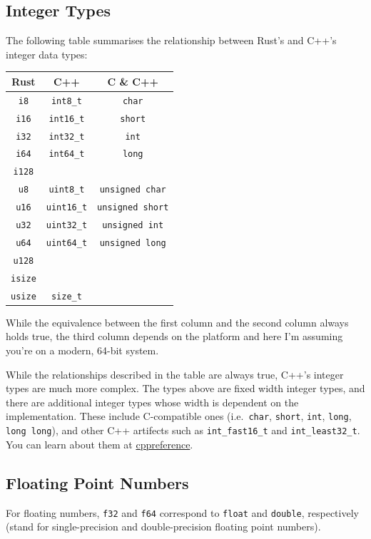 \documentclass[
]{book}
\begin{document}
\hypertarget{integer-types}{%
\subsection{Integer Types}\label{integer-types}}

The following table summarises the relationship between Rust's and C++'s integer data types:

\begin{longtable}[]{@{}ccc@{}}
\toprule
Rust & C++ & C \& C++\tabularnewline
\midrule
\endhead
\texttt{i8} & \texttt{int8\_t} & \texttt{char}\tabularnewline
\texttt{i16} & \texttt{int16\_t} & \texttt{short}\tabularnewline
\texttt{i32} & \texttt{int32\_t} & \texttt{int}\tabularnewline
\texttt{i64} & \texttt{int64\_t} & \texttt{long}\tabularnewline
\texttt{i128} & &\tabularnewline
\texttt{u8} & \texttt{uint8\_t} & \texttt{unsigned\ char}\tabularnewline
\texttt{u16} & \texttt{uint16\_t} & \texttt{unsigned\ short}\tabularnewline
\texttt{u32} & \texttt{uint32\_t} & \texttt{unsigned\ int}\tabularnewline
\texttt{u64} & \texttt{uint64\_t} & \texttt{unsigned\ long}\tabularnewline
\texttt{u128} & &\tabularnewline
\texttt{isize} & &\tabularnewline
\texttt{usize} & \texttt{size\_t} &\tabularnewline
\bottomrule
\end{longtable}

While the equivalence between the first column and the second column always holds true,
the third column depends on the platform and here I'm assuming you're on a modern, 64-bit
system.

While the relationships described in the table are always true, C++'s integer types
are much more complex. The types above are fixed width integer types, and there are
additional integer types whose width is dependent on the implementation. These include
C-compatible ones (i.e.~\texttt{char}, \texttt{short}, \texttt{int}, \texttt{long}, \texttt{long\ long}), and other C++
artifects such as \texttt{int\_fast16\_t} and \texttt{int\_least32\_t}. You can learn about them at
\href{https://en.cppreference.com/w/cpp/types/integer}{cppreference}.

\hypertarget{floating-point-numbers}{%
\subsection{Floating Point Numbers}\label{floating-point-numbers}}

For floating numbers, \texttt{f32} and \texttt{f64} correspond to \texttt{float} and \texttt{double}, respectively
(stand for single-precision and double-precision floating point numbers).
\end{document}
